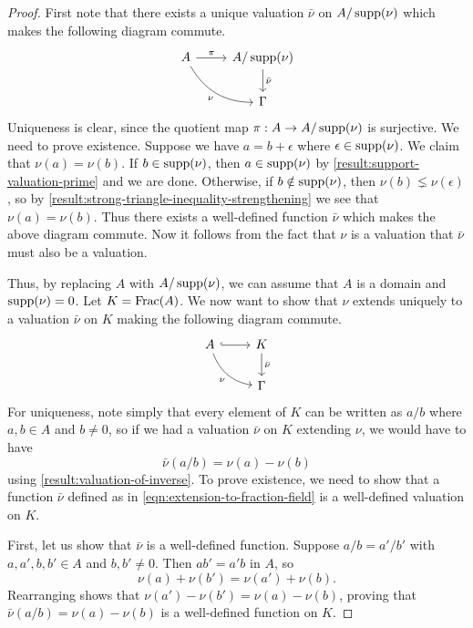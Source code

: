 \begin{proof}
First note that there exists a unique valuation $\bar{\nu}$ on $A/\operatorname{supp}(\nu)$ which makes the following diagram commute. 
\[ \begin{tikzcd} A \ar{r}{\pi} \ar[bend right]{dr}[swap]{\nu} & A/\supp(\nu) \ar{d}{\bar{\nu}} \\ & \Gamma \end{tikzcd} \]
Uniqueness is clear, since the quotient map $\pi : A \to A/\operatorname{supp}(\nu)$ is surjective. We need to prove existence. Suppose we have $a = b + \epsilon$ where $\epsilon \in \operatorname{supp}(\nu)$. We claim that $\nu(a) = \nu(b)$. If $b \in \operatorname{supp}(\nu)$, then $a \in \operatorname{supp}(\nu)$ by \cref{result:support-valuation-prime} and we are done. Otherwise, if $b \notin \operatorname{supp}(\nu)$, then $\nu(b) \lneq \nu(\epsilon)$, so by \cref{result:strong-triangle-inequality-strengthening} we see that $\nu(a) = \nu(b)$. Thus there exists a well-defined function $\bar{\nu}$ which makes the above diagram commute. Now it follows from the fact that $\nu$ is a valuation that $\bar{\nu}$ must also be a valuation. 

Thus, by replacing $A$ with $A/\operatorname{supp}(\nu)$, we can assume that $A$ is a domain and $\operatorname{supp}(\nu) = 0$. Let $K = \operatorname{Frac}(A)$. We now want to show that $\nu$ extends uniquely to a valuation $\bar{\nu}$ on $K$ making the following diagram commute. 
\[ \begin{tikzcd} A \ar[hookrightarrow]{r} \ar[bend right]{dr}[swap]{\nu} & K \ar{d}{\bar{\nu}} \\ & \Gamma \end{tikzcd} \]
For uniqueness, note simply that every element of $K$ can be written as $a/b$ where $a, b \in A$ and $b \neq 0$, so if we had a valuation $\bar{\nu}$ on $K$ extending $\nu$, we would have to have
\begin{equation} \label{eqn:extension-to-fraction-field} \bar{\nu}(a/b) = \nu(a) - \nu(b) \end{equation}
using \cref{result:valuation-of-inverse}. To prove existence, we need to show that a function $\bar{\nu}$ defined as in \cref{eqn:extension-to-fraction-field} is a well-defined valuation on $K$. 

First, let us show that $\bar{\nu}$ is a well-defined function. Suppose $a/b = a'/b'$ with $a, a', b, b' \in A$ and $b, b' \neq 0$. Then $ab' = a'b$ in $A$, so
\[ \nu(a) + \nu(b') = \nu(a') + \nu(b). \]
Rearranging shows that $\nu(a') - \nu(b') = \nu(a) - \nu(b)$, proving that $\bar{\nu}(a/b) = \nu(a) - \nu(b)$ is a well-defined function on $K$. 


\end{proof}
